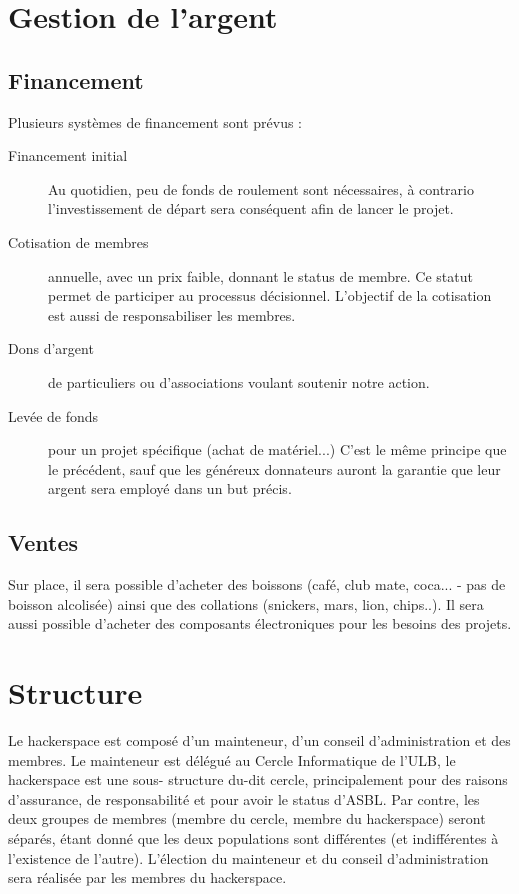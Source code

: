 \documentclass{article}
\begin{document}
\section{Gestion de l'argent}
\subsection{Financement}

Plusieurs systèmes de financement sont prévus :
\begin{description}
\item[Financement initial]
Au quotidien, peu de fonds de roulement sont nécessaires, à contrario l'investissement de départ sera conséquent afin de lancer le projet.
\item[Cotisation de membres] annuelle, avec un prix faible, donnant le status de membre. 
Ce statut permet de participer au processus décisionnel.
L'objectif de la cotisation est aussi de responsabiliser les membres.
\item[Dons d'argent] de particuliers ou d'associations voulant soutenir notre action.
\item[Levée de fonds] pour un projet spécifique (achat de matériel...) C'est 
le même principe que le précédent, sauf que les généreux donnateurs auront la 
garantie que leur argent sera employé dans un but précis.\end{description}

\subsection{Ventes}

Sur place, il sera possible d'acheter des boissons (café, club mate, coca... - 
pas de boisson alcolisée) ainsi que des collations (snickers, mars, lion, chips..).
Il sera aussi possible d'acheter des composants électroniques pour les besoins des projets.


\section{Structure}

Le hackerspace est composé d'un mainteneur, d'un conseil d'administration et des membres.
Le mainteneur est délégué au Cercle Informatique de l'ULB, le hackerspace est 
une sous- structure du-dit cercle, principalement pour des raisons d'assurance,
de responsabilité et pour avoir le status d'ASBL. Par contre, les deux groupes de 
membres (membre du cercle, membre du hackerspace) seront séparés, étant donné que 
les deux populations sont différentes (et indifférentes à l'existence de l'autre). 
L'élection du mainteneur et du conseil d'administration sera réalisée par les 
membres du hackerspace.
\end{document}
